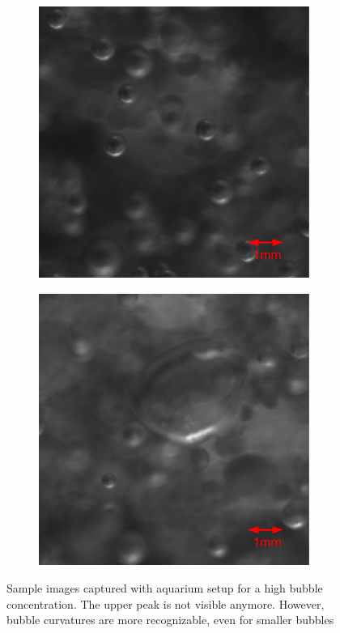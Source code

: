 					
		\begin{figure}[h]
			\begin{subfigure}[t]{.4\textwidth}
				\centering
				\includegraphics[scale=0.5]{images/aquarium_result_high_conc_1.png}
				\caption{}
			\end{subfigure}\hfill
			\begin{subfigure}[t]{.4\textwidth}
				\centering
				\includegraphics[scale=0.5]{images/aquarium_result_high_conc_2.png}
				\caption{}
				\label{subfig:too_large_bubble}
			\end{subfigure}\hfill		
			\caption{Sample images captured with aquarium setup for a high bubble concentration. The upper peak is not visible anymore. However, bubble curvatures are more recognizable, even for smaller bubbles}
			\label{fig:aquarium_result_high_conc}
		\end{figure}							
					
